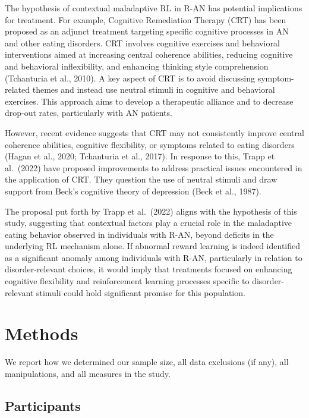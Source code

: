 \documentclass[
  man,floatsintext]{apa6}
\begin{document}
The hypothesis of contextual maladaptive RL in R-AN has potential implications for treatment. For example, Cognitive Remediation Therapy (CRT) has been proposed as an adjunct treatment targeting specific cognitive processes in AN and other eating disorders. CRT involves cognitive exercises and behavioral interventions aimed at increasing central coherence abilities, reducing cognitive and behavioral inflexibility, and enhancing thinking style comprehension (Tchanturia et al., 2010). A key aspect of CRT is to avoid discussing symptom-related themes and instead use neutral stimuli in cognitive and behavioral exercises. This approach aims to develop a therapeutic alliance and to decrease drop-out rates, particularly with AN patients.

However, recent evidence suggests that CRT may not consistently improve central coherence abilities, cognitive flexibility, or symptoms related to eating disorders (Hagan et al., 2020; Tchanturia et al., 2017). In response to this, Trapp et al.~(2022) have proposed improvements to address practical issues encountered in the application of CRT. They question the use of neutral stimuli and draw support from Beck's cognitive theory of depression (Beck et al., 1987).

The proposal put forth by Trapp et al.~(2022) aligns with the hypothesis of this study, suggesting that contextual factors play a crucial role in the maladaptive eating behavior observed in individuals with R-AN, beyond deficits in the underlying RL mechanism alone. If abnormal reward learning is indeed identified as a significant anomaly among individuals with R-AN, particularly in relation to disorder-relevant choices, it would imply that treatments focused on enhancing cognitive flexibility and reinforcement learning processes specific to disorder-relevant stimuli could hold significant promise for this population.

\hypertarget{methods}{%
\section{Methods}\label{methods}}

We report how we determined our sample size, all data exclusions (if any), all manipulations, and all measures in the study.

\hypertarget{participants}{%
\subsection{Participants}\label{participants}}
\end{document}
